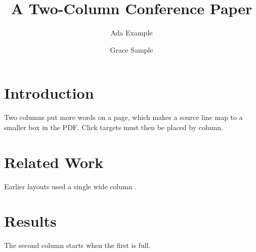 \documentclass[10pt,twocolumn]{article}
\title{A Two-Column Conference Paper}
\author{Ada Example \and Grace Sample}
\date{}
\begin{document}

\section{Introduction}
Two columns put more words on a page, which makes a source line map to a
smaller box in the PDF. Click targets must then be placed by column.

\section{Related Work}
Earlier layouts used a single wide column \cite{knuth84}.

\section{Results}
The second column starts when the first is full.



\end{document}
